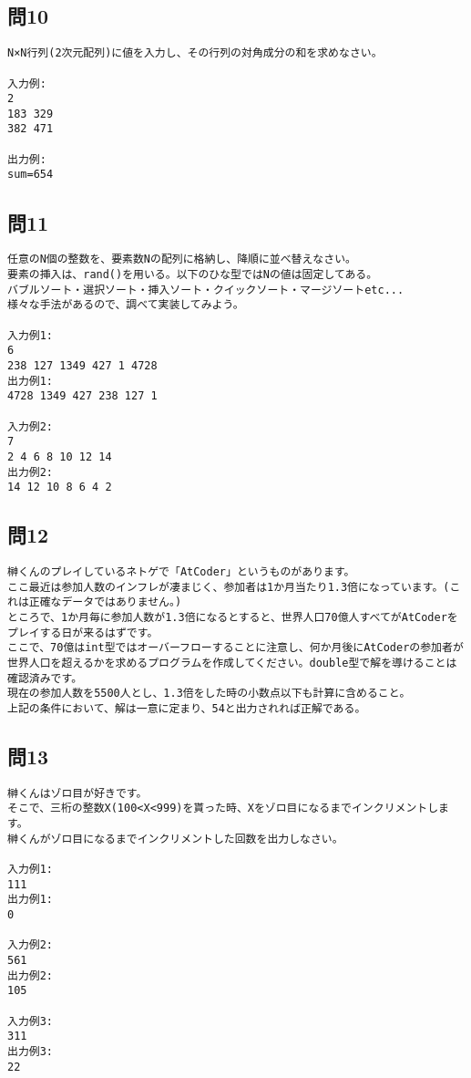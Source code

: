\subsection{問10}
\begin{verbatim}
N×N行列(2次元配列)に値を入力し、その行列の対角成分の和を求めなさい。

入力例:
2
183 329
382 471

出力例:
sum=654
\end{verbatim}

\subsection{問11}
\begin{verbatim}
任意のN個の整数を、要素数Nの配列に格納し、降順に並べ替えなさい。
要素の挿入は、rand()を用いる。以下のひな型ではNの値は固定してある。
バブルソート・選択ソート・挿入ソート・クイックソート・マージソートetc...
様々な手法があるので、調べて実装してみよう。

入力例1:
6
238 127 1349 427 1 4728
出力例1:
4728 1349 427 238 127 1

入力例2:
7
2 4 6 8 10 12 14
出力例2:
14 12 10 8 6 4 2
\end{verbatim}

\subsection{問12}
\begin{verbatim}
榊くんのプレイしているネトゲで「AtCoder」というものがあります。
ここ最近は参加人数のインフレが凄まじく、参加者は1か月当たり1.3倍になっています。(これは正確なデータではありません。)
ところで、1か月毎に参加人数が1.3倍になるとすると、世界人口70億人すべてがAtCoderをプレイする日が来るはずです。
ここで、70億はint型ではオーバーフローすることに注意し、何か月後にAtCoderの参加者が世界人口を超えるかを求めるプログラムを作成してください。double型で解を導けることは確認済みです。
現在の参加人数を5500人とし、1.3倍をした時の小数点以下も計算に含めること。
上記の条件において、解は一意に定まり、54と出力されれば正解である。
\end{verbatim}

\subsection{問13}
\begin{verbatim}
榊くんはゾロ目が好きです。
そこで、三桁の整数X(100<X<999)を貰った時、Xをゾロ目になるまでインクリメントします。
榊くんがゾロ目になるまでインクリメントした回数を出力しなさい。

入力例1:
111
出力例1:
0

入力例2:
561
出力例2:
105

入力例3:
311
出力例3:
22
\end{verbatim}

